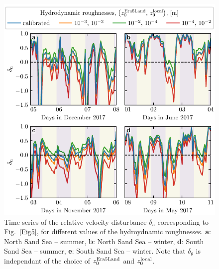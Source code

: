 \begin{figure}[p]
\centering
\includegraphics[scale=1]{Figures/Figure14_supp.pdf}
\caption{Time series of the relative velocity disturbance $\delta_{u}$ corresponding to Fig.~\ref{Fig5}, for different values of the hydroydnamic roughnesses. \textbf{a}: North Sand Sea – summer, \textbf{b}: North Sand Sea – winter, \textbf{d}: South Sand Sea – summer, \textbf{e}: South Sand Sea – winter. Note that $\delta_{\theta}$ is independant of the choice of $z_{0}^{\textup{Era5Land}}$ and $z_{0}^{\textup{local}}$.}
\label{Fig14_supp}
\end{figure}




